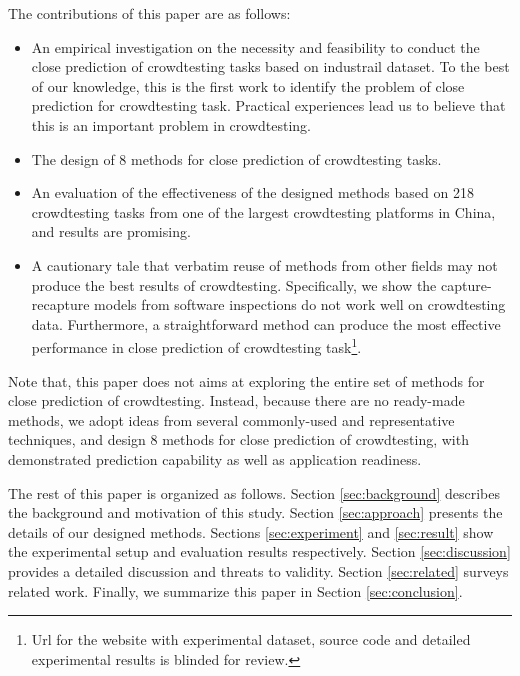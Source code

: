 \documentclass[sigconf,review, anonymous]{acmart}
\newcommand{\task}{218}
\begin{document}
The contributions of this paper are as follows:

\begin{itemize}
\item An empirical investigation on the necessity and feasibility to conduct the close prediction of crowdtesting tasks based on industrail dataset. To the best of our knowledge, this is the first work to identify the problem of close prediction for crowdtesting task. Practical experiences lead us to believe that this is an important problem in crowdtesting.

\item The design of 8 methods for close prediction of crowdtesting tasks.

\item An evaluation of the effectiveness of the designed methods based on {\task} crowdtesting tasks from one of the largest crowdtesting platforms in China, and results are promising.

\item A cautionary tale that verbatim reuse of methods from other fields may not produce the best results of crowdtesting. Specifically, we show the capture-recapture models from software inspections do not work well on crowdtesting data. Furthermore, a straightforward method can produce the most effective performance in close prediction of crowdtesting task\footnote{Url for the website with experimental dataset, source
code and detailed experimental results is blinded for review.}.

\end{itemize}

Note that, this paper does not aims at exploring the entire set of methods for close prediction of crowdtesting. 
Instead, because there are no ready-made methods, we adopt ideas from several commonly-used and representative techniques\cite{lyu1996handbook,yamada2014software}, and design 8 methods for close prediction of crowdtesting, with demonstrated prediction capability as well as application readiness. 


The rest of this paper is organized as follows. Section \ref{sec:background} describes the background and motivation of this study. Section \ref{sec:approach} presents the details of our designed methods. Sections \ref{sec:experiment} and \ref{sec:result} show the experimental setup and evaluation results
respectively. Section \ref{sec:discussion} provides a detailed discussion and threats to validity. Section \ref{sec:related} surveys related
work. Finally, we summarize this paper in Section \ref{sec:conclusion}.
\end{document}
